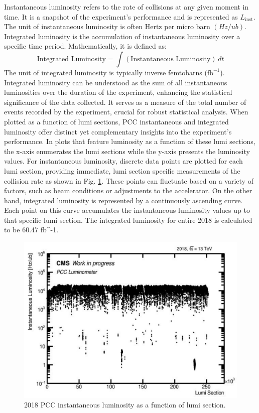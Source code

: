 Instantaneous luminosity refers to the rate of collisions at any given moment in time. It is a snapshot of the experiment's performance and is represented as \( L_{\text{inst}} \). The unit of instantaneous luminosity is often Hertz per micro barn $(Hz/ub)$. Integrated luminosity is the accumulation of instantaneous luminosity over a specific time period. Mathematically, it is defined as:
\[
\text{Integrated Luminosity} = \int (\text{Instantaneous Luminosity}) \, dt
\]
The unit of integrated luminosity is typically inverse femtobarns (\( \text{fb}^{-1} \)). Integrated luminosity can be understood as the sum of all instantaneous luminosities over the duration of the experiment, enhancing the statistical significance of the data collected. It serves as a measure of the total number of events recorded by the experiment, crucial for robust statistical analysis. When plotted as a function of lumi sections, PCC instantaneous and integrated luminosity offer distinct yet complementary insights into the experiment's performance. In plots that feature luminosity as a function of these lumi sections, the x-axis enumerates the lumi sections while the y-axis presents the luminosity values.  For instantaneous luminosity, discrete data points are plotted for each lumi section, providing immediate, lumi section specific measurements of the collision rate as shown in Fig. \ref{fig:PCC_inst_2018}. These points can fluctuate based on a variety of factors, such as beam conditions or adjustments to the accelerator. On the other hand, integrated luminosity is represented by a continuously ascending curve. Each point on this curve accumulates the instantaneous luminosity values up to that specific lumi section. The integrated luminosity for entire 2018 is calculated to be 60.47 fb^{-1}.


\begin{figure}[!htp]
\centering
\includegraphics[width=1\textwidth]{ashish_thesis/PCClumivslumisection_2018_1.png}
\caption[2018 PCC Inst. Luminosity]{%
 2018 PCC instantaneous luminosity as a function of lumi section.
}
\label{fig:PCC_inst_2018}
\end{figure}


